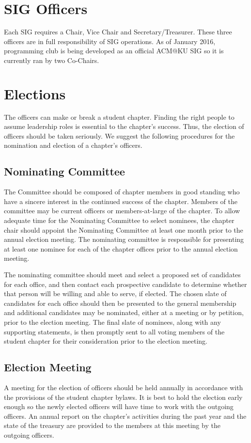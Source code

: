 \section*{SIG Officers}
Each SIG requires a Chair, Vice Chair and Secretary/Treasurer. These three officers are in full responsibility of SIG operations. As of January 2016, programming club is being developed as an official ACM@KU SIG so it is currently ran by two Co-Chairs.

\section{Elections}

The officers can make or break a student chapter. Finding the right people to assume leadership roles is essential to the chapter's success. Thus, the election of officers should be taken seriously. We suggest the following procedures for the nomination and election of a chapter's officers.
\subsection*{Nominating Committee}
The Committee should be composed of chapter members in good standing who have a sincere interest in the continued success of the chapter. Members of the committee may be current officers or members-at-large of the chapter. To allow adequate time for the Nominating Committee to select nominees, the chapter chair should appoint the Nominating Committee at least one month prior to the annual election meeting. The nominating committee is responsible for presenting at least one nominee for each of the chapter offices prior to the annual election meeting.

The nominating committee should meet and select a proposed set of candidates for each office, and then contact each prospective candidate to determine whether that person will be willing and able to serve, if elected. The chosen slate of candidates for each office should then be presented to the general membership and additional candidates may be nominated, either at a meeting or by petition, prior to the election meeting. The final slate of nominees, along with any supporting statements, is then promptly sent to all voting members of the student chapter for their consideration prior to the election meeting.
\subsection*{Election Meeting}
A meeting for the election of officers should be held annually in accordance with the provisions of the student chapter bylaws. It is best to hold the election early enough so the newly elected officers will have time to work with the outgoing officers. An annual report on the chapter's activities during the past year and the state of the treasury are provided to the members at this meeting by the outgoing officers.
